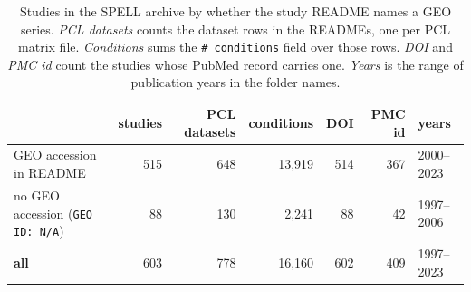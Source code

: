 \begin{table}[H]\centering
\footnotesize
\caption[]{Studies in the SPELL archive by whether the study README names a GEO
series. \emph{PCL datasets} counts the dataset rows in the READMEs, one per PCL
matrix file. \emph{Conditions} sums the \texttt{\# conditions} field over those
rows. \emph{DOI} and \emph{PMC id} count the studies whose PubMed record carries
one. \emph{Years} is the range of publication years in the folder names.}\label{tab:summary}
\begin{tabular}{lrrrrrl}
\toprule
& studies & PCL datasets & conditions & DOI & PMC id & years \\
\midrule
GEO accession in README & 515 & 648 & 13,919 & 514 & 367 & 2000--2023 \\
no GEO accession (\texttt{GEO ID: N/A}) & 88 & 130 & 2,241 & 88 & 42 & 1997--2006 \\
\midrule
\textbf{all} & 603 & 778 & 16,160 & 602 & 409 & 1997--2023 \\
\bottomrule
\end{tabular}
\end{table}
